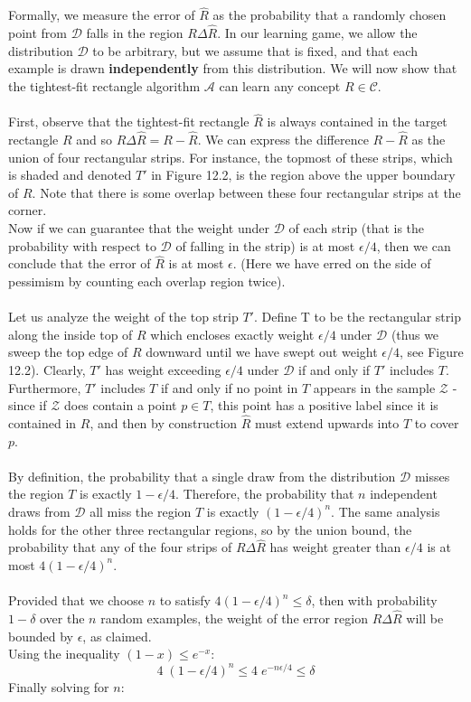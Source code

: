 \documentclass[twoside]{article}
\begin{document}
Formally, we measure the error of $\hat{R}$ as the probability that a randomly chosen point from $\mathcal{D}$ falls in the region $R \Delta \hat{R}$. In our learning game, we allow the distribution $\mathcal{D}$ to be arbitrary, but we assume that is fixed, and that each example is drawn \textbf{independently} from this distribution. We will now show that the tightest-fit rectangle algorithm $\mathcal{A}$ can learn any concept $ R \in \mathcal{C}$.\\\\

First, observe that the tightest-fit rectangle $\hat{R}$ is always contained in the target rectangle $R$ and so $R \Delta \hat{R} = R - \hat{R}$. We can express the difference $R-\hat{R}$ as the union of four rectangular strips. For instance, the topmost of these strips, which is shaded and denoted $T'$ in Figure 12.2, is the region above  the upper boundary of $R$. Note that there is some overlap between these four rectangular strips at the corner.\\ Now if we can guarantee that the weight under $\mathcal{D}$ of each strip (that is the probability with respect to $\mathcal{D}$ of falling in the strip) is at most $\epsilon/4$, then we can conclude that the error of $\hat{R}$ is at most $\epsilon$. (Here we have erred on the side of pessimism by counting each overlap region twice).\\\\
Let us analyze the weight of the top strip $T'$. Define T to be the rectangular strip along the inside top of $R$ which encloses exactly weight $\epsilon/4$ under $\mathcal{D}$ (thus we sweep the top edge of $R$ downward until we have swept out weight $\epsilon/4$, see Figure 12.2). Clearly, $T'$
has weight exceeding $\epsilon/4$ under $\mathcal{D}$ if and only if $T'$ includes $T$. Furthermore, $T'$ includes $T$ if and only if no point in $T$ appears in the sample $\mathcal{Z}$ - since if $\mathcal{Z}$ does contain a point $p \in T$, this point has a positive label since it is contained in $R$, and then by construction  $\hat{R}$ must extend upwards into $T$ to cover $p$.\\\\
By definition, the probability that a single draw from the distribution $\mathcal{D}$ misses the region $T$ is exactly $1- \epsilon / 4$. Therefore, the probability that $n$ independent draws from $\mathcal{D}$ all miss the region $T$ is exactly $(1-\epsilon/4)^n$. The same analysis holds for the other three rectangular regions, so by the union bound, the probability that any of the four strips of $R \Delta \hat{R}$ has weight greater than $\epsilon/4$ is at most $4(1-\epsilon/4)^n$.\\\\
Provided that we choose $n$ to satisfy $4(1-\epsilon/4)^n \leq \delta$, then with probability $1-\delta$ over the $n$ random examples, the weight of the error region $R \Delta \hat{R}$ will be bounded by $\epsilon$, as claimed.\\ Using the inequality $(1-x) \leq e^{-x}$:
$$4 \; (1-\epsilon/4)^n \leq 4 \; e^{-n\epsilon/4} \leq \delta$$
Finally solving for $n$:
\end{document}

